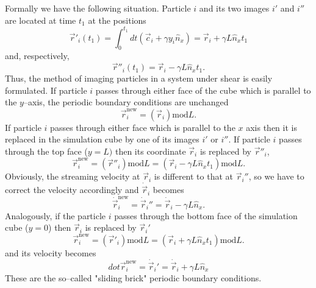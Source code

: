 Formally we have the following situation. Particle $i$ and its two images
$i'$ and $i''$ are located at time $t_1$ at the positions 
\begin{displaymath}
  \vec{r}'_i(t_1) = \int_0^{t_1} dt 
                    \left( \vec{c}_i + \gamma y_i \hat{n}_x 
                    \right) = \vec{r}_i + \gamma L \hat{n}_x t_1
\end{displaymath}
and, respectively,
\begin{displaymath}
  \vec{r}''_i(t_1) = \vec{r}_i - \gamma L \hat{n}_x t_1.
\end{displaymath}
Thus, the method of imaging particles in a system under shear is easily
formulated. If particle $i$ passes through either face of the cube which is
parallel to the $y$--axis, the periodic boundary conditions are unchanged
\begin{displaymath}
  \vec{r}^{\mathrm{new}}_i = (\vec{r}_i) \mathrm{mod} L.
\end{displaymath}
If particle $i$ passes through either face which is parallel to the $x$ axis
then it is replaced in the simulation cube by one of its images $i'$ or $i''$.
If particle $i$ passes through the top face ($y=L)$ then its coordinate
$\vec{r}_i$ is replaced by $\vec{r}{''}_i$,
\begin{displaymath}
  \vec{r}^{\mathrm{new}}_i = (\vec{r}{''}_i) \mathrm{mod} L 
                           = (\vec{r}_i - \gamma L \hat{n}_x t_1) 
                           \mathrm{mod} L.
\end{displaymath}
Obviously, the streaming velocity at $\vec{r}_i$ is different to that at
$\vec{r}_i''$, so we have to correct the velocity accordingly and 
$\dot{\vec{r}}_i$ becomes
\begin{displaymath}
  \dot{\vec{r}}^{\mathrm{new}}_i = \dot{\vec{r}}_i''
                            = \dot{\vec{r}}_i - \gamma L \hat{n}_x.
\end{displaymath}
Analogously, if the particle $i$ passes through the bottom face
of the simulation cube ($y=0$) then $\vec{r}_i$ is replaced by
$\vec{r}_i'$
\begin{displaymath}
  \vec{r}^{\mathrm{new}}_i = (\vec{r}{'}_i) \mathrm{mod} L 
                           = (\vec{r}_i + \gamma L \hat{n}_x t_1) 
                           \mathrm{mod} L.
\end{displaymath}
and its velocity becomes
\begin{displaymath}
  dot{\vec{r}}^{\mathrm{new}}_i = \dot{\vec{r}}_i'
                            = \dot{\vec{r}}_i + \gamma L \hat{n}_x
\end{displaymath}
These are the so--called "sliding brick" periodic boundary conditions.

